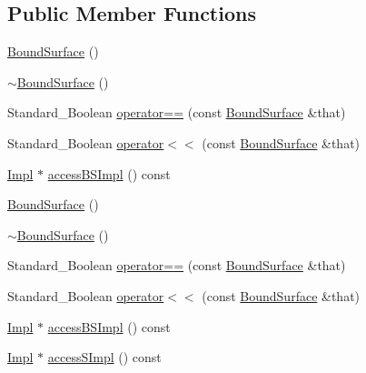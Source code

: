 \subsection*{Public Member Functions}
\begin{DoxyCompactItemize}
\item 
\hyperlink{classMcCAD_1_1Geometry_1_1BoundSurface_a50af5d5cd7cc2a92400422f57988d137}{Bound\+Surface} ()
\item 
\hyperlink{classMcCAD_1_1Geometry_1_1BoundSurface_ad3aa6d10d1c8e652b2100d73e7be38a2}{$\sim$\+Bound\+Surface} ()
\item 
Standard\+\_\+\+Boolean \hyperlink{classMcCAD_1_1Geometry_1_1BoundSurface_a5c7eafa600bd89b55fa06ddb9b21cc08}{operator==} (const \hyperlink{classMcCAD_1_1Geometry_1_1BoundSurface}{Bound\+Surface} \&that)
\item 
Standard\+\_\+\+Boolean \hyperlink{classMcCAD_1_1Geometry_1_1BoundSurface_a2443caf3cbbe81e666df60745a92db28}{operator$<$$<$} (const \hyperlink{classMcCAD_1_1Geometry_1_1BoundSurface}{Bound\+Surface} \&that)
\item 
\hyperlink{classMcCAD_1_1Geometry_1_1BoundSurface_1_1Impl}{Impl} $\ast$ \hyperlink{classMcCAD_1_1Geometry_1_1BoundSurface_aaf5a1d89894e9a90fee2e1f355638d0b}{access\+B\+S\+Impl} () const
\item 
\hyperlink{classMcCAD_1_1Geometry_1_1BoundSurface_a50af5d5cd7cc2a92400422f57988d137}{Bound\+Surface} ()
\item 
\hyperlink{classMcCAD_1_1Geometry_1_1BoundSurface_ad3aa6d10d1c8e652b2100d73e7be38a2}{$\sim$\+Bound\+Surface} ()
\item 
Standard\+\_\+\+Boolean \hyperlink{classMcCAD_1_1Geometry_1_1BoundSurface_a5c7eafa600bd89b55fa06ddb9b21cc08}{operator==} (const \hyperlink{classMcCAD_1_1Geometry_1_1BoundSurface}{Bound\+Surface} \&that)
\item 
Standard\+\_\+\+Boolean \hyperlink{classMcCAD_1_1Geometry_1_1BoundSurface_a2443caf3cbbe81e666df60745a92db28}{operator$<$$<$} (const \hyperlink{classMcCAD_1_1Geometry_1_1BoundSurface}{Bound\+Surface} \&that)
\item 
\hyperlink{classMcCAD_1_1Geometry_1_1BoundSurface_1_1Impl}{Impl} $\ast$ \hyperlink{classMcCAD_1_1Geometry_1_1BoundSurface_a7b638aa31593926d6210aad6a30e1f47}{access\+B\+S\+Impl} () const
\item 
\hyperlink{classMcCAD_1_1Geometry_1_1BoundSurface_1_1Impl}{Impl} $\ast$ \hyperlink{classMcCAD_1_1Geometry_1_1Surface_a989de1f9ebe3de043412014ed25e52eb}{access\+S\+Impl} () const
\item 

\end{DoxyCompactItemize}
